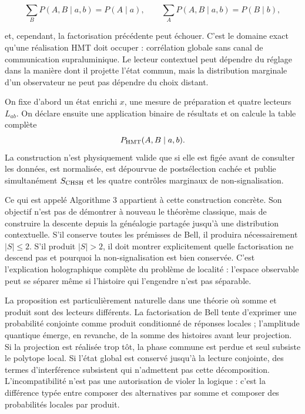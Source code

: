 \[
  \sum_B P(A,B\mid a,b)=P(A\mid a),
  \qquad
  \sum_A P(A,B\mid a,b)=P(B\mid b),
\]

et, cependant, la factorisation précédente peut échouer. C'est le domaine exact qu'une
réalisation HMT doit occuper : corrélation globale sans canal de communication
supraluminique. Le lecteur contextuel peut dépendre du réglage dans la manière dont
il projette l'état commun, mais la distribution marginale d'un observateur ne peut pas
dépendre du choix distant.

\begin{construction}
On fixe d'abord un état enrichi \(x\), une mesure de préparation et quatre
lecteurs \(L_{ab}\). On déclare ensuite une application binaire de résultats et on calcule
la table complète
\[
  P_{\rm HMT}(A,B\mid a,b).
\]
La construction n'est physiquement valide que si elle est figée avant de consulter
les données, est normalisée, est dépourvue de postsélection cachée et publie simultanément
\(S_{\rm CHSH}\) et les quatre contrôles marginaux de non-signalisation.
\end{construction}

Ce qui est appelé Algorithme 3 appartient à cette construction concrète. Son objectif n'est pas
de démontrer à nouveau le théorème classique, mais de construire la descente depuis la
généalogie partagée jusqu'à une distribution contextuelle. S'il conserve toutes les
prémisses de Bell, il produira nécessairement \(|S|\leq2\). S'il produit
\(|S|>2\), il doit montrer explicitement quelle factorisation ne descend pas et pourquoi
la non-signalisation est bien conservée. C'est l'explication holographique complète du
problème de localité : l'espace observable peut se séparer même si l'histoire qui
l'engendre n'est pas séparable.

La proposition est particulièrement naturelle dans une théorie où somme et produit sont
des lecteurs différents. La factorisation de Bell tente d'exprimer une probabilité
conjointe comme produit conditionné de réponses locales ; l'amplitude quantique
émerge, en revanche, de la somme des histoires avant leur projection. Si la projection est
réalisée trop tôt, la phase commune est perdue et seul subsiste le polytope local.
Si l'état global est conservé jusqu'à la lecture conjointe, des termes
d'interférence subsistent qui n'admettent pas cette décomposition. L'incompatibilité n'est pas une
autorisation de violer la logique : c'est la différence typée entre composer des alternatives
par somme et composer des probabilités locales par produit.

